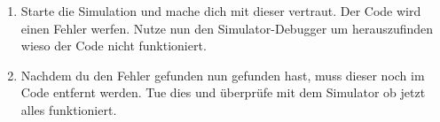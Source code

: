 
\begin{enumerate}
    \item Starte die Simulation und mache dich mit dieser vertraut. Der Code wird einen Fehler werfen. Nutze nun den Simulator-Debugger um herauszufinden wieso der Code nicht funktioniert.
    \item Nachdem du den Fehler gefunden nun gefunden hast, muss dieser noch im Code entfernt werden. Tue dies und überprüfe mit dem Simulator ob jetzt alles funktioniert.
\end{enumerate}